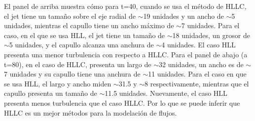 \documentclass[12pt,a4paper]{book}
\begin{document}
El panel de arriba muestra cómo para t=40, cuando se usa el método de HLLC, el jet tiene un tamaño sobre el eje radial de $\sim$19 unidades y un ancho de $\sim$5 unidades, mientras el capullo tiene un 
ancho máximo de $\sim$7 unidades. Para el caso, en el que se usa HLL, el jet tiene un tamaño de $\sim$18 unidades, un grosor de $\sim$5 unidades, y el capullo alcanza una anchura de $\sim$4 unidades. El caso HLL presenta 
una menor turbulencia con respecto a HLLC.
Para el panel de abajo (a t=80), en el caso de HLLC, presenta un largo de $\sim$32 unidades, un ancho es de $\sim$7 unidades y su capullo tiene una anchura de $\sim$11 unidades. Para el caso en que se usa HLL, el largo 
y ancho miden $\sim$31.5 y $\sim$8 respectivamente, mientras que el capullo presenta un tamaño de $\sim$11.5 unidades. Nuevamente, el caso HLL presenta menos turbulencia que el caso HLLC. Por lo que se puede inferir que HLLC
es un mejor métodos para la modelación de flujos.
\end{document}

